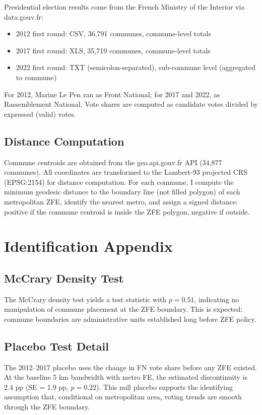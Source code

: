\documentclass[12pt]{article}
\begin{document}
Presidential election results come from the French Ministry of the Interior via data.gouv.fr:
\begin{itemize}
\item 2012 first round: CSV, 36,791 communes, commune-level totals
\item 2017 first round: XLS, 35,719 communes, commune-level totals
\item 2022 first round: TXT (semicolon-separated), sub-commune level (aggregated to commune)
\end{itemize}

For 2012, Marine Le Pen ran as Front National; for 2017 and 2022, as Rassemblement National. Vote shares are computed as candidate votes divided by expressed (valid) votes.

\subsection{Distance Computation}

Commune centroids are obtained from the geo.api.gouv.fr API (34,877 communes). All coordinates are transformed to the Lambert-93 projected CRS (EPSG:2154) for distance computation. For each commune, I compute the minimum geodesic distance to the boundary line (not filled polygon) of each metropolitan ZFE, identify the nearest metro, and assign a signed distance: positive if the commune centroid is inside the ZFE polygon, negative if outside.

\section{Identification Appendix}

\subsection{McCrary Density Test}

The McCrary density test \citep{cattaneo2020density} yields a test statistic with $p = 0.51$, indicating no manipulation of commune placement at the ZFE boundary. This is expected: commune boundaries are administrative units established long before ZFE policy.

\subsection{Placebo Test Detail}

The 2012--2017 placebo uses the change in FN vote share before any ZFE existed. At the baseline 5 km bandwidth with metro FE, the estimated discontinuity is 2.4 pp (SE = 1.9 pp, $p = 0.22$). This null placebo supports the identifying assumption that, conditional on metropolitan area, voting trends are smooth through the ZFE boundary.
\end{document}
